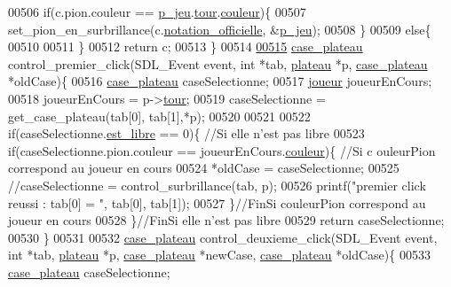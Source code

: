 \begin{DoxyCode}
00506         \textcolor{keywordflow}{if}(c.pion.couleur == \hyperlink{moteur_8h_a3efa8d0f7c65daedc584dc8db048e62c}{p_jeu}.\hyperlink{structplateau_ab38c06b0c7e61b9eeb63b04c5e5bc652}{tour}.\hyperlink{structjoueur_a057f95a41503a890f27c651969ffac8d}{couleur})\{
00507                 set\_pion\_en\_surbrillance(c.\hyperlink{structcase__plateau_ad510581b324604a9cf685cbb769a421a}{notation_officielle}, &\hyperlink{moteur_8h_a3efa8d0f7c65daedc584dc8db048e62c}{p_jeu});
00508         \}
00509         \textcolor{keywordflow}{else}\{
00510 
00511         \}
00512         \textcolor{keywordflow}{return} c;
00513 \}
00514 
\hypertarget{fonction_interface_8c_source_l00515}{}\hyperlink{fonction_interface_8h_abcb8707f8b1169dceb38a3e3e2b3e300}{00515} \hyperlink{structcase__plateau}{case_plateau} control\_premier\_click(SDL\_Event event, \textcolor{keywordtype}{int} *tab, \hyperlink{structplateau}{plateau} *p, 
      \hyperlink{structcase__plateau}{case_plateau} *oldCase)\{
00516         \hyperlink{structcase__plateau}{case_plateau} caseSelectionne;
00517         \hyperlink{structjoueur}{joueur} joueurEnCours;
00518         joueurEnCours = p->\hyperlink{structplateau_ab38c06b0c7e61b9eeb63b04c5e5bc652}{tour};
00519         caseSelectionne = get\_case\_plateau(tab[0], tab[1],*p);
00520 
00521 
00522         \textcolor{keywordflow}{if}(caseSelectionne.\hyperlink{structcase__plateau_a173f25d2fd7c653d77ca8174ba4f636d}{est_libre} == 0)\{ \textcolor{comment}{//Si elle n'est pas libre}
00523                 \textcolor{keywordflow}{if}(caseSelectionne.pion.couleur == joueurEnCours.\hyperlink{structjoueur_a057f95a41503a890f27c651969ffac8d}{couleur})\{ \textcolor{comment}{//Si c
      ouleurPion correspond au joueur en cours}
00524                         *oldCase = caseSelectionne;
00525                         \textcolor{comment}{//caseSelectionne = control\_surbrillance(tab, p);}
00526                         printf(\textcolor{stringliteral}{"premier click reussi : tab[0] = %
      "}, tab[0], tab[1]);
00527                 \}\textcolor{comment}{//FinSi couleurPion correspond au joueur en cours}
00528         \}\textcolor{comment}{//FinSi elle n'est pas libre}
00529         \textcolor{keywordflow}{return} caseSelectionne;
00530 \}
00531 
00532 \hyperlink{structcase__plateau}{case_plateau} control\_deuxieme\_click(SDL\_Event event, \textcolor{keywordtype}{int} *tab, \hyperlink{structplateau}{plateau} *p, 
      \hyperlink{structcase__plateau}{case_plateau} *newCase, \hyperlink{structcase__plateau}{case_plateau} *oldCase)\{
00533         \hyperlink{structcase__plateau}{case_plateau} caseSelectionne;

\end{DoxyCode}
